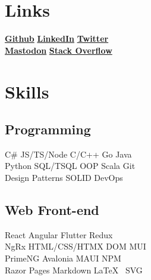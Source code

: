 \documentclass[letterpaper]{cv_12} %
\begin{document}
\begin{minipage}[t]{0.33\textwidth} %


\section{Links} 

\href{https://github.com/cile-bgd}{\bf Github} \textbullet{} 
\href{https://www.linkedin.com/in/sinisa-petkovic-b704034/}{\bf LinkedIn} \textbullet{}
\href{https://twitter.com/SinisaPetkovic}{\bf Twitter}\\
\href{https://c.im/@foontzoot}{\bf Mastodon} \textbullet{}
\href{https://stackoverflow.com/users/3758665/sinisa-petkovic}{\bf Stack Overflow}



\section{Skills}

\subsection{Programming}

C\# \textbullet{} JS/TS/Node \textbullet{} C/C++ \textbullet{} Go \textbullet{} Java\\
Python \textbullet{} SQL/TSQL \textbullet{} OOP \textbullet{} Scala \textbullet{} Git\\
Design Patterns \textbullet{} SOLID \textbullet{} DevOps

\sectionspace%

\subsection{Web Front-end}

React \textbullet{} Angular \textbullet{} Flutter \textbullet{} Redux\\
NgRx \textbullet{} HTML/CSS/HTMX \textbullet{} DOM \textbullet{} MUI\\
PrimeNG \textbullet{} Avalonia \textbullet{} MAUI \textbullet{} NPM\\
Razor Pages \textbullet{} Markdown \textbullet{} \LaTeX\ \textbullet{} SVG


\end{minipage}
\end{document}
